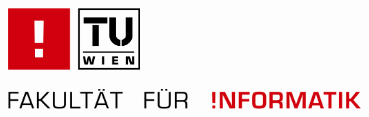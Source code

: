 \begin{titlepage}
\selectfont

\vspace*{-0.75cm}

\begin{minipage}[t]{0.3\linewidth}
\begin{flushleft}
\includegraphics[width=3.49cm,height=1.65cm]{images/fakultaet-fuer-informatik-logo.png}
\end{flushleft}
\end{minipage}
\begin{minipage}[t]{0.7\linewidth}
\begin{flushright}
\vspace*{-1.65cm}
\includegraphics[width=9.34cm,height=0.53cm]{images/fakultaet-fuer-informatik-text.png}
\end{flushright}
\end{minipage}

\vspace{1.0cm}

\begin{center}
\dmseries\huge{\thesistitle \\ \thesissubtitle}
\end{center}

\vspace{0.5cm}

\renewcommand{\bigskip}{\vspace*{0.43cm}}


\end{titlepage}

